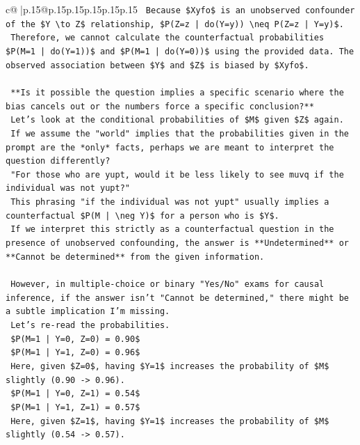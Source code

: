 \documentclass{article}
\begin{document}
{\begin{supertabular}{c@{$\;$}|p{.15\linewidth}@{}p{.15\linewidth}p{.15\linewidth}p{.15\linewidth}p{.15\linewidth}p{.15\linewidth}}
{{{\texttt{    Because \$Xyfo\$ is an unobserved confounder of the \$Y \textbackslash{}to Z\$ relationship, \$P(Z=z | do(Y=y)) \textbackslash{}neq P(Z=z | Y=y)\$.} \\
\texttt{    Therefore, we cannot calculate the counterfactual probabilities \$P(M=1 | do(Y=1))\$ and \$P(M=1 | do(Y=0))\$ using the provided data. The observed association between \$Y\$ and \$Z\$ is biased by \$Xyfo\$.} \\
\\ 
\texttt{    **Is it possible the question implies a specific scenario where the bias cancels out or the numbers force a specific conclusion?**} \\
\texttt{    Let's look at the conditional probabilities of \$M\$ given \$Z\$ again.} \\
\texttt{    If we assume the "world" implies that the probabilities given in the prompt are the *only* facts, perhaps we are meant to interpret the question differently?} \\
\texttt{    "For those who are yupt, would it be less likely to see muvq if the individual was not yupt?"} \\
\texttt{    This phrasing "if the individual was not yupt" usually implies a counterfactual \$P(M | \textbackslash{}neg Y)\$ for a person who is \$Y\$.} \\
\texttt{    If we interpret this strictly as a counterfactual question in the presence of unobserved confounding, the answer is **Undetermined** or **Cannot be determined** from the given information.} \\
\\ 
\texttt{    However, in multiple{-}choice or binary "Yes/No" exams for causal inference, if the answer isn't "Cannot be determined," there might be a subtle implication I'm missing.} \\
\texttt{    Let's re{-}read the probabilities.} \\
\texttt{    \$P(M=1 | Y=0, Z=0) = 0.90\$} \\
\texttt{    \$P(M=1 | Y=1, Z=0) = 0.96\$} \\
\texttt{    Here, given \$Z=0\$, having \$Y=1\$ increases the probability of \$M\$ slightly (0.90 {-}> 0.96).} \\
\texttt{    \$P(M=1 | Y=0, Z=1) = 0.54\$} \\
\texttt{    \$P(M=1 | Y=1, Z=1) = 0.57\$} \\
\texttt{    Here, given \$Z=1\$, having \$Y=1\$ increases the probability of \$M\$ slightly (0.54 {-}> 0.57).} \\
}}}
\end{supertabular}}
\end{document}
